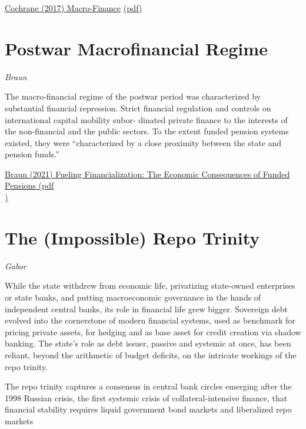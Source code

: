 \documentclass[
]{book}
\begin{document}
\href{https://academic.oup.com/rof/article/21/3/945/3060346}{Cochrane (2017) Macro-Finance}
\href{pdf/Cochrane_2017_Macro-Finance.pdf}{(pdf)}

\hypertarget{postwar-macrofinancial-regime}{%
\section{Postwar Macrofinancial Regime}\label{postwar-macrofinancial-regime}}

\emph{Braun}

The macro-financial regime of the postwar
period was characterized by substantial financial
repression. Strict financial regulation and
controls on international capital mobility subor-
dinated private finance to the interests of the
non-financial and the public sectors. To the
extent funded pension systems existed, they
were ``characterized by a close proximity
between the state and pension funds.''

\href{pdf/Braun_2021_Fueling_Financialization_Funded_Pensions.pdf}{Braun (2021) Fueling Financialization: The Economic Consequences of Funded Pensions (pdf\\
)}

\hypertarget{the-impossible-repo-trinity}{%
\section{The (Impossible) Repo Trinity}\label{the-impossible-repo-trinity}}

\emph{Gabor}

While the state withdrew from economic life, privatizing state-owned enterprises or state banks, and putting macroeconomic governance in the hands of independent central banks, its role in financial life grew bigger. Sovereign debt evolved into the cornerstone of modern financial systems, used as benchmark for pricing private assets, for hedging and as base asset for credit creation via shadow banking. The state's role as debt issuer, passive and systemic at once, has been reliant, beyond the arithmetic of budget deficits, on the intricate workings of the repo trinity.

The repo trinity captures a consensus in central bank circles emerging after the 1998 Russian crisis, the first systemic crisis of collateral-intensive finance, that financial stability requires liquid government bond markets and liberalized repo markets
\end{document}
